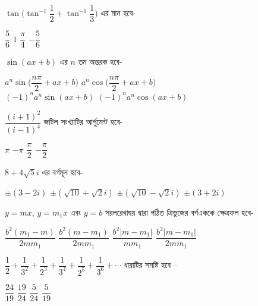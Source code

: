 \documentclass[addpoints]{exam}
\begin{document}
\begin{questions}
\question $ \tan \Big(\tan^{-1}\dfrac{1}{2} + \tan^{-1}\dfrac{1}{3} \Big) $ এর মান হবে-

\begin{oneparchoices}
\choice $ \dfrac{5}{6} $
\choice $ 1 $
\choice $ \dfrac{\pi}{4} $
\choice $ - \dfrac{5}{6}$

\end{oneparchoices}

\question  $ \sin (ax +b) $ এর $ n $ তম অন্তরক হবে-

\begin{oneparchoices}
\choice  $a^{n} \sin\Big(\dfrac{n\pi}{2} + ax+b\Big)$
\choice  $a^{n} \cos\Big(\dfrac{n\pi}{2} + ax+b\Big)$\\
\choice  $(-1)^{n}a^{n} \sin (ax +b) $
\choice  $(-1)^{n}a^{n} \cos (ax +b) $
\end{oneparchoices}

\question $ \dfrac{(i+1)^{2}}{(i-1)^{4}} $  জটিল সংখ্যাটির আর্গুমেন্ট হবে-

\begin{oneparchoices}
\choice $ \pi $
\choice $ -\pi $
\choice $  \dfrac{\pi}{2} $
\choice  $  -\dfrac{\pi}{2} $

\end{oneparchoices}

\question $ 8+4\sqrt{5}i $ এর বর্গমূল হবে-

\begin{oneparchoices}
\choice $ \pm(3-2i) $
\choice $ \pm(\sqrt{10} + \sqrt{2}i) $
\choice $ \pm(\sqrt{10} - \sqrt{2}i) $
\choice $ \pm(3+2i) $

\end{oneparchoices}

\question  $ y=mx,\, y=m_{1}x $ এবং $ y=b  $ সরলরেখাদ্বয় দ্বারা গঠিত ত্রিভুজের বর্গএককে ক্ষেত্রফল হবে-

\begin{oneparchoices}
\choice $ \dfrac{b^{2}(m_{1}-m)}{2mm_{1}} $
\choice  $ \dfrac{b^{2}(m-m_{1})}{2mm_{1}} $
\choice $ \dfrac{b^{2}|m-m_{1}|}{mm_{1}} $
\choice $ \dfrac{b^{2}|m-m_{1}|}{2mm_{1}} $

\end{oneparchoices}


\question $ \dfrac{1}{2} + \dfrac{1}{3^{2}} + \dfrac{1}{2^{3}} + \dfrac{1}{3^{4}} + \dfrac{1}{2^{5}}+ \dfrac{1}{3^{6}}+\cdots $  ধারাটির সমষ্টি হবে – 

\begin{oneparchoices}
\choice  $ \dfrac{24}{19} $
\choice  $ \dfrac{19}{24} $
\choice  $ \dfrac{5}{24} $
\choice $ \dfrac{5}{19} $
\end{oneparchoices}


\end{questions}
\end{document}
